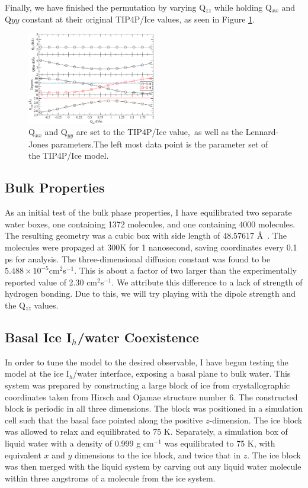 \documentclass[aps, jcp, prl, reprint, groupedaddress, superscriptaddress, twocolumn]{revtex4-1}
\begin{document}
Finally, we have finished the permutation by varying Q$_{zz}$ while holding
Q$_{xx}$ and Q${yy}$ constant at their original TIP4P/Ice values, as seen
in Figure \ref{fig:Qyy5}.

\begin{figure}[h!]
\includegraphics[width=0.5\textwidth]{Test25_plot.pdf}
\caption{\label{fig:Qyy5} Q$_{xx}$ and Q$_{yy}$ are set to the TIP4P/Ice value,\
as well as the Lennard-Jones parameters.The left most data point is the parameter set of the TIP4P/Ice model.}
\end{figure}


\subsection{Bulk Properties}
As an initial test of the bulk phase properties, I have equilibrated two
separate water boxes, one containing 1372 molecules, and one
containing 4000 molecules. The resulting geometry was a cubic
box with side length of 48.57617 \AA~. The molecules were propaged at 300K for
1 nanosecond, saving coordinates every 0.1 ps for analysis. The 
three-dimensional diffusion constant was found to be 
$5.488\times10^{-5}$cm$^{2}$s$^{-1}$. This is about a factor of two larger
than the experimentally reported value of 2.30 cm$^{2}$s$^{-1}$. We attribute
this difference to a lack of strength of hydrogen bonding. Due to this,
we will try playing with the dipole strength and the Q$_{zz}$ values.
		

\subsection{Basal Ice I$_{h}$/water Coexistence}
In order to tune the model to the desired observable, I have begun testing 
the model at the ice I$_{h}$/water interface, exposing a basal plane to bulk 
water. This system was prepared by constructing a large block of ice from 
crystallographic coordinates taken from Hirsch and Ojamae structure number
6\cite{Hirsch04}. The constructed block is periodic in all three dimensions. 
The block was positioned in a simulation cell such that the basal face pointed
along the positive $z$-dimension. The ice block was allowed to relax and 
equilibrated to 75 K. Separately, a simulation box of liquid water with a 
density of 0.999 g cm$^{-1}$ was 
equilibrated to 75 K, with equivalent $x$ and $y$ dimensions to the ice block,
and twice that in $z$. The ice block was then merged with the liquid system
by carving out any liquid water molecule within three angstroms of a molecule
from the ice system.
	
\end{document}
